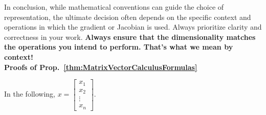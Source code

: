 In conclusion, while mathematical conventions can guide the choice of representation, the ultimate decision often depends on the specific context and operations in which the gradient or Jacobian is used. Always prioritize clarity and correctness in your work. \textbf{Always ensure that the dimensionality matches the operations you intend to perform. That's what we mean by context!} \\


\textbf{Proofs of Prop.~\ref{thm:MatrixVectorCalculusFormulas}}

In the following, $x = \left[ \begin{array}{c} x_1 \\x_2 \\ \vdots \\ x_n\end{array} \right]$.\\

